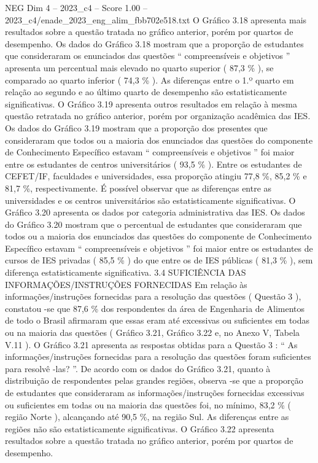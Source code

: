\begin{textsample}{NEG Dim 4 – 2023\_c4 – Score 1.00 – 2023\_c4/enade\_2023\_eng\_alim\_fbb702e518.txt}
O Gráfico 3.18 apresenta mais resultados sobre a questão tratada no gráfico anterior, porém por quartos de desempenho.
Os dados do Gráfico 3.18 mostram que a proporção de estudantes que consideraram os enunciados das questões “ compreensíveis e objetivos ” apresenta um percentual mais elevado no quarto superior ( 87,3 \% ), se comparado ao quarto inferior ( 74,3 \% ).
As diferenças entre o 1.º quarto em relação ao segundo e ao último quarto de desempenho são estatisticamente significativas.
O Gráfico 3.19 apresenta outros resultados em relação à mesma questão retratada no gráfico anterior, porém por organização acadêmica das IES.
Os dados do Gráfico 3.19 mostram que a proporção dos presentes que consideraram que todos ou a maioria dos enunciados das questões do componente de Conhecimento Específico estavam “ compreensíveis e objetivos ” foi maior entre os estudantes de centros universitários ( 93,5 \% ).
Entre os estudantes de CEFET/IF, faculdades e universidades, essa proporção atingiu 77,8 \%, 85,2 \% e 81,7 \%, respectivamente.
É possível observar que as diferenças entre as universidades e os centros universitários são estatisticamente significativas.
O Gráfico 3.20 apresenta os dados por categoria administrativa das IES.
Os dados do Gráfico 3.20 mostram que o percentual de estudantes que consideraram que todos ou a maioria dos enunciados das questões do componente de Conhecimento Específico estavam “ compreensíveis e objetivos ” foi maior entre os estudantes de cursos de IES privadas ( 85,5 \% ) do que entre os de IES públicas ( 81,3 \% ), sem diferença estatisticamente significativa. 3.4 SUFICIÊNCIA DAS INFORMAÇÕES/INSTRUÇÕES FORNECIDAS Em relação às informações/instruções fornecidas para a resolução das questões ( Questão 3 ), constatou -se que 87,6 \% dos respondentes da área de Engenharia de Alimentos de todo o Brasil afirmaram que essas eram até excessivas ou suficientes em todas ou na maioria das questões ( Gráfico 3.21, Gráfico 3.22 e, no Anexo V, Tabela V.11 ).
O Gráfico 3.21 apresenta as respostas obtidas para a Questão 3 : “ As informações/instruções fornecidas para a resolução das questões foram suficientes para resolvê -las? ”.
De acordo com os dados do Gráfico 3.21, quanto à distribuição de respondentes pelas grandes regiões, observa -se que a proporção de estudantes que consideraram as informações/instruções fornecidas excessivas ou suficientes em todas ou na maioria das questões foi, no mínimo, 83,2 \% ( região Norte ), alcançando até 90,5 \%, na região Sul.
As diferenças entre as regiões não são estatisticamente significativas.
O Gráfico 3.22 apresenta resultados sobre a questão tratada no gráfico anterior, porém por quartos de desempenho.

\end{textsample}
